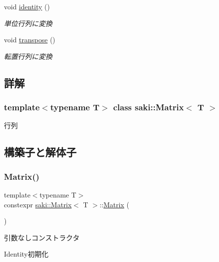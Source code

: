 \begin{DoxyCompactItemize}
void \mbox{\hyperlink{classsaki_1_1_matrix_af0c4f3614c29e27eae5fecde22140be8}{identity}} ()
\begin{DoxyCompactList}\small\item\em 単位行列に変換 \end{DoxyCompactList}\item 
void \mbox{\hyperlink{classsaki_1_1_matrix_a78f7166af66941378ae5903bd266d309}{transpose}} ()
\begin{DoxyCompactList}\small\item\em 転置行列に変換 \end{DoxyCompactList}\end{DoxyCompactItemize}


\subsection{詳解}
\subsubsection*{template$<$typename T$>$\newline
class saki\+::\+Matrix$<$ T $>$}

行列 

\subsection{構築子と解体子}
\mbox{\label{classsaki_1_1_matrix_a820035e9bafc0fa4269c4b94b1ec4f4f}} 
\subsubsection{\texorpdfstring{Matrix()}{Matrix()}\hspace{0.1cm}{\footnotesize\ttfamily [1/6]}}
{\footnotesize\ttfamily template$<$typename T$>$ \\
constexpr \mbox{\hyperlink{classsaki_1_1_matrix}{saki\+::\+Matrix}}$<$ T $>$\+::\mbox{\hyperlink{classsaki_1_1_matrix}{Matrix}} (\begin{DoxyParamCaption}{ }\end{DoxyParamCaption})\hspace{0.3cm}{\ttfamily [inline]}}



引数なしコンストラクタ 

Identity初期化 \mbox{\label{classsaki_1_1_matrix_adaebd9a3c078f5c10eaf225d70faaa66}} 
